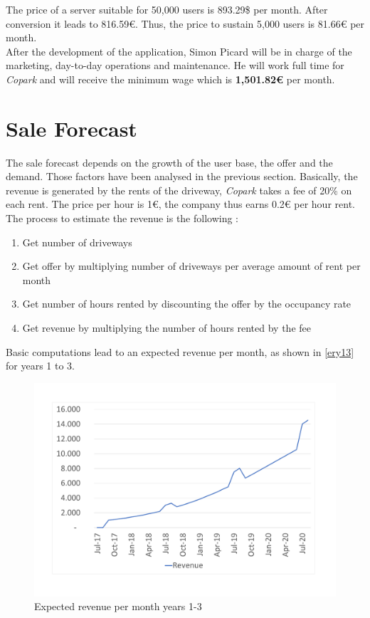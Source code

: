 \documentclass[12pt,a4paper,oneside]{book}
\newcommand{\bp}{\textit{Copark}}
\begin{document}
The price of a server suitable for 50,000 users is 893.29\$ per month.\cite{awsclwa} After conversion it leads to 816.59\euro{}. Thus, the price to sustain 5,000 users is 81.66\euro{} per month.\\

After the development of the application, Simon Picard will be in charge of the marketing, day-to-day operations and maintenance. He will work full time for \bp{} and will receive the minimum wage which is \textbf{1,501.82\euro{}} per month.\cite{eurostatmw}\\


\section{Sale Forecast}
\label{sf}

The sale forecast depends on the growth of the user base, the offer and the demand. Those factors have been analysed in the previous section. Basically, the revenue is generated by the rents of the driveway, \bp{} takes a fee of 20\% on each rent. The price per hour is 1\euro{}, the company thus earns 0.2\euro{} per hour rent.\\

The process to estimate the revenue is the following :
\begin{enumerate}
\item Get number of driveways
\item Get offer by multiplying number of driveways per average amount of rent per month
\item Get number of hours rented by discounting the offer by the occupancy rate
\item Get revenue by multiplying the number of hours rented by the fee
\end{enumerate}

Basic computations lead to an expected revenue per month, as shown in \autoref{ery13} for years 1 to 3.\\

\begin{figure}[h]
\centering
\caption{Expected revenue per month years 1-3}
\label{ery13}
\includegraphics[keepaspectratio=true,width=\textwidth-2cm]{../graph/expectedrev.pdf}
\end{figure}
\end{document}

